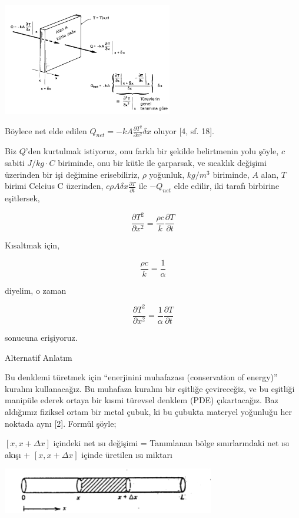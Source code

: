 \documentclass[12pt,fleqn]{article}\usepackage{../../common}
\begin{document}
\includegraphics[width=20em]{heat_3.png}

Böylece net elde edilen $Q_{net} = -k A \frac{\partial T^2}{\partial x^2} \delta x$
oluyor [4, sf. 18].

Biz $Q$'den kurtulmak istiyoruz, onu farklı bir şekilde belirtmenin yolu şöyle,
$c$ sabiti $J / kg \cdot C$ biriminde, onu bir kütle ile çarparsak, ve sıcaklık
değişimi üzerinden bir işi değimine erisebiliriz, $\rho$ yoğunluk, $kg/m^3$
biriminde, $A$ alan, $T$ birimi Celcius C üzerinden,
$c \rho A \delta x \frac{\partial T}{\partial t}$ ile $-Q_{net}$ elde edilir,
iki tarafı birbirine eşitlersek,

$$
\frac{\partial T^2}{\partial x^2} = \frac{\rho c}{k} \frac{\partial T}{\partial t}
$$

Kısaltmak için,

$$
 \frac{\rho c}{k} = \frac{1}{\alpha}
$$

diyelim, o zaman

$$
\frac{\partial T^2}{\partial x^2} = \frac{1}{\alpha} \frac{\partial T}{\partial t}
$$

sonucuna erişiyoruz.

Alternatif Anlatım

Bu denklemi türetmek için ``enerjinini muhafazası (conservation of
energy)'' kuralını kullanacağız. Bu muhafaza kuralını bir eşitliğe
çevireceğiz, ve bu eşitliği manipüle ederek ortaya bir kısmi türevsel
denklem (PDE) çıkartacağız. Baz aldığımız fiziksel ortam bir metal çubuk,
ki bu çubukta materyel yoğunluğu her noktada aynı [2].  Formül şöyle;

$[x,x+\Delta x]$ içindeki net ısı değişimi = Tanımlanan bölge
sınırlarındaki net ısı akışı + $[x,x+\Delta x]$ içinde üretilen ısı miktarı

\includegraphics[height=2cm]{heat_1.png}
\end{document}
